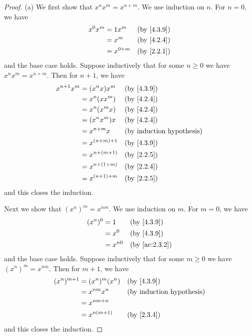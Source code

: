 \begin{proof}{(a)}
  We first show that \(x^n x^m = x^{n + m}\).
  We use induction on \(n\).
  For \(n = 0\), we have
  \begin{align*}
    x^0 x^m & = 1 x^m     &  & \by{4.3.9} \\
            & = x^m       &  & \by{4.2.4} \\
            & = x^{0 + m} &  & \by{2.2.1}
  \end{align*}
  and the base case holds.
  Suppose inductively that for some \(n \geq 0\) we have \(x^n x^m = x^{n + m}\).
  Then for \(n + 1\), we have
  \begin{align*}
    x^{n + 1} x^m & = (x^n x) x^m     &  & \by{4.3.9} \\
                  & = x^n (x x^m)     &  & \by{4.2.4} \\
                  & = x^n (x^m x)     &  & \by{4.2.4} \\
                  & = (x^n x^m) x     &  & \by{4.2.4} \\
                  & = x^{n + m} x     &  & \byIH      \\
                  & = x^{(n + m) + 1} &  & \by{4.3.9} \\
                  & = x^{n + (m + 1)} &  & \by{2.2.5} \\
                  & = x^{n + (1 + m)} &  & \by{2.2.4} \\
                  & = x^{(n + 1) + m} &  & \by{2.2.5}
  \end{align*}
  and this closes the induction.

  Next we show that \((x^n)^m = x^{nm}\).
  We use induction on \(m\).
  For \(m = 0\), we have
  \begin{align*}
    (x^n)^0 & = 1      &  & \by{4.3.9}    \\
            & = x^0    &  & \by{4.3.9}    \\
            & = x^{n0} &  & \by{ac:2.3.2}
  \end{align*}
  and the base case holds.
  Suppose inductively that for some \(m \geq 0\) we have \((x^n)^m = x^{nm}\).
  Then for \(m + 1\), we have
  \begin{align*}
    (x^n)^{m + 1} & = (x^n)^m (x^n) &  & \by{4.3.9} \\
                  & = x^{nm} x^n    &  & \byIH      \\
                  & = x^{nm + n}                    \\
                  & = x^{n(m + 1)}  &  & \by{2.3.4}
  \end{align*}
  and this closes the induction.


\end{proof}
